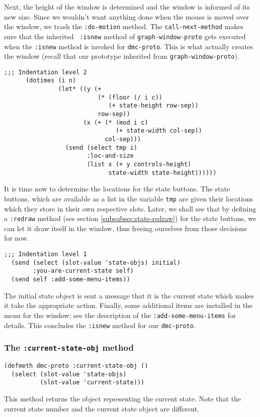 Next, the height of the window is determined and the window is
informed of its new size. Since we wouldn't want anything done when
the mouse is moved over the window, we trash the {\tt :do-motion}
method. The {\tt call-next-method} makes sure that the inherited {\tt
  :isnew} method of {\tt graph-window-proto} gets executed when the
{\tt :isnew} method is invoked for {\tt dmc-proto}. This is 
what actually creates the window (recall that our prototype inherited
from {\tt graph-window-proto}). 
\begin{verbatim}    
;;; Indentation level 2
      (dotimes (i n)
               (let* ((y (+ 
                          (* (floor (/ i c)) 
                             (+ state-height row-sep)) 
                          row-sep))
                      (x (+ (* (mod i c) 
                               (+ state-width col-sep)) 
                            col-sep)))
                 (send (select tmp i) 
                       :loc-and-size 
                       (list x (+ y controls-height) 
                             state-width state-height))))))
\end{verbatim}
It is time now to determine the locations for the state buttons. The
state buttons, which are available as a list in the variable {\tt tmp}
are given their locations which they store in their own respective
slots. Later, we shall see that by defining a {\tt :redraw} method
(see section \ref{subsubsec:state-redraw}) for
the state buttons, we can let it draw itself in the window, thus
freeing ourselves from those decisions for now. 
\begin{verbatim}
;;; Indentation level 1
  (send (select (slot-value 'state-objs) initial)
        :you-are-current-state self)
  (send self :add-some-menu-items))
\end{verbatim}
The initial state object is sent a message that it is the current
state which makes it take the appropriate action.  Finally, some
additional items are installed in the menu for the window; see the
description of the {\tt :add-some-menu-items} for details.
This concludes the {\tt :isnew} method for our {\tt dmc-proto}. 

\subsubsection{The {\tt :current-state-obj} method}
\label{subsubsec:current-state-obj}
\begin{verbatim}
(defmeth dmc-proto :current-state-obj ()
  (select (slot-value 'state-objs) 
          (slot-value 'current-state)))
\end{verbatim}
This method returns the object representing the current state. Note
that the current state number and the current state object are
different. 

